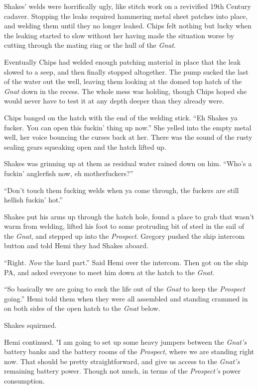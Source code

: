 \documentclass[]{scrbook}
\begin{document}
Shakes' welds were horrifically ugly, like stitch work on a revivified
19th Century cadaver. Stopping the leaks required hammering metal sheet
patches into place, and welding them until they no longer leaked. Chips
felt nothing but lucky when the leaking started to slow without her
having made the situation worse by cutting through the mating ring or
the hull of the \emph{Gnat}.

Eventually Chips had welded enough patching material in place that the
leak slowed to a seep, and then finally stopped altogether. The pump
sucked the last of the water out the well, leaving them looking at the
domed top hatch of the \emph{Gnat} down in the recess. The whole mess
was holding, though Chips hoped she would never have to test it at any
depth deeper than they already were.

Chips banged on the hatch with the end of the welding stick. ``Eh Shakes
ya fucker. You can open this fuckin' thing up now.'' She yelled into the
empty metal well, her voice bouncing the curses back at her. There was
the sound of the rusty sealing gears squeaking open and the hatch lifted
up.

Shakes was grinning up at them as residual water rained down on him.
``Who's a fuckin' anglerfish now, eh motherfuckers?''

``Don't touch them fucking welds when ya come through, the fuckers are
still hellish fuckin' hot.''

Shakes put his arms up through the hatch hole, found a place to grab
that wasn't warm from welding, lifted his foot to some protruding bit of
steel in the sail of the \emph{Gnat}, and stepped up into the
\emph{Prospect}. Gregory pushed the ship intercom button and told Hemi
they had Shakes aboard.

``Right. \emph{Now} the hard part.'' Said Hemi over the intercom. Then
got on the ship PA, and asked everyone to meet him down at the hatch to
the \emph{Gnat}.

``So basically we are going to suck the life out of the \emph{Gnat} to
keep the \emph{Prospect} going.'' Hemi told them when they were all
assembled and standing crammed in on both sides of the open hatch to the
\emph{Gnat} below.

Shakes squirmed.

Hemi continued. "I am going to set up some heavy jumpers between the
\emph{Gnat's} battery banks and the battery rooms of the
\emph{Prospect}, where we are standing right now. That should be pretty
straightforward, and give us access to the \emph{Gnat's} remaining
battery power. Though not much, in terms of the \emph{Prospect's} power
consumption.
\end{document}
